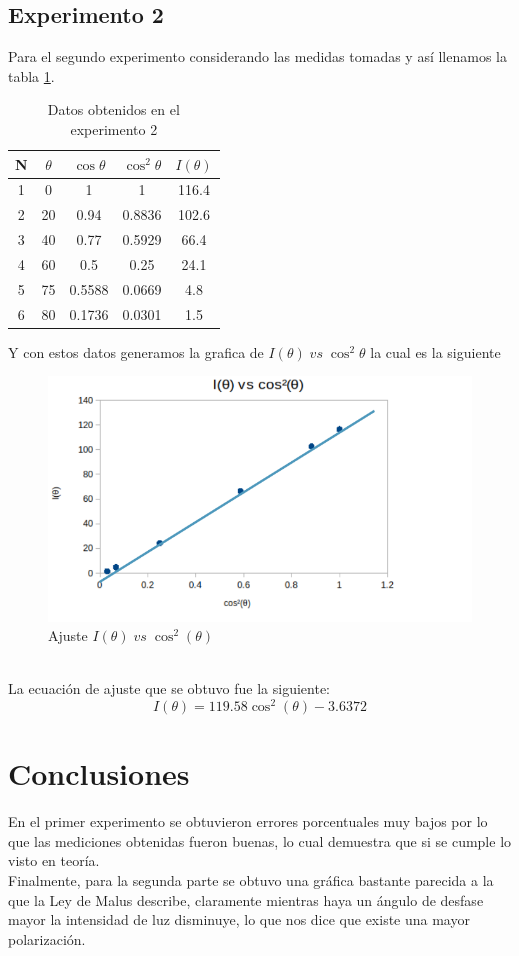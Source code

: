 \documentclass[13,twocolumn,letterpaper]{article}
\begin{document}
\subsection{Experimento 2}
Para el segundo experimento considerando las medidas tomadas y así llenamos
la  tabla \ref{tabla2}.
\begin{table}[htb]
	\centering
	\begin{tabular}{ccccc}
		N & $\theta$ & $\cos\theta$ & $\cos^{2}\theta$  & $I(\theta)$ \\ \midrule
		1  & 0 	& 1 	 &	1	 	& 116.4	 \\
		2  & 20 & 0.94 	 & 0.8836 	& 102.6	 \\
		3  & 40 & 0.77	 & 0.5929	& 66.4	 \\
		4  & 60 &  0.5	 & 0.25		& 24.1	 \\
		5  & 75 & 0.5588 & 0.0669   & 4.8    \\
		6  & 80 & 0.1736 & 0.0301   & 1.5	 \\\hline
	\end{tabular}
	\caption{Datos obtenidos en el experimento 2} \label{tabla2}
\end{table}
\newpage Y con estos datos generamos la grafica de $I(\theta) \;vs\;\cos^{2}\theta$ la cual es la siguiente
\begin{figure}[h!]
	\centering
	\includegraphics[width=1.2\linewidth]{fig4}
	\caption[Figura 1]{Ajuste $I(\theta)\;vs\;\cos^{2}(\theta)$}
	\label{fig:fig4}
\end{figure}
\\La ecuaci\'on de ajuste que se obtuvo fue la siguiente:
\begin{equation}
	I(\theta)=119.58\cos^{2}(\theta)-3.6372
\end{equation}
\section*{Conclusiones}
En el primer experimento se obtuvieron errores porcentuales muy bajos por lo que las mediciones obtenidas fueron buenas, lo cual demuestra que si se cumple lo visto en teoría.\\
Finalmente, para la segunda parte se obtuvo una gráfica bastante parecida a la
que la Ley de Malus describe, claramente mientras haya un ángulo de desfase
mayor la intensidad de luz disminuye, lo que nos dice que existe una mayor
polarización.
\nocite{Hecht}\nocite{Rossi}\nocite{Sears}\nocite{Born}\nocite{Tipler}\nocite{Feynman}\nocite{Res}


\end{document}
